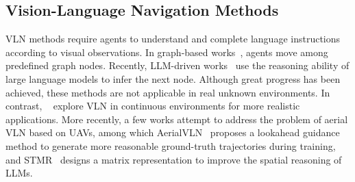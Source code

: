 \subsection{Vision-Language Navigation Methods}
VLN methods require agents to understand and complete language instructions according to visual observations. In graph-based works~\cite{Xiong_2019,Zhang_2019,Srinivasa_2019,Wang_2020}, agents move among predefined graph nodes. Recently, LLM-driven works~\cite{Navgpt,NavGPT-2,mapgpt} use the reasoning ability of large language models to infer the next node. Although great progress has been achieved, these methods are not applicable in real unknown environments. In contrast, ~\cite{Chang_2021,Kumar_2021,Maksymets_2021,navid} explore VLN in continuous environments for more realistic applications. More recently, a few works attempt to address the problem of aerial VLN based on UAVs, among which AerialVLN~\cite{aerialVLN} proposes a lookahead guidance method to generate more reasonable ground-truth trajectories during training, and STMR~\cite{stmr} designs a matrix representation to improve the spatial reasoning of LLMs.

